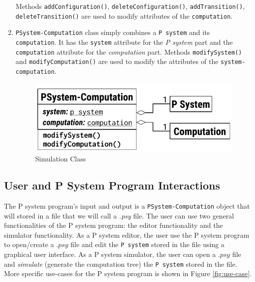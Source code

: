 \documentclass{article}
\begin{document}
\begin{enumerate}
Methods \texttt{addConfiguration()}, \texttt{deleteConfiguration()}, \texttt{addTransition()},
\texttt{deleteTransition()} are used to modify attributes of the \texttt{computation}.


\item \texttt{PSystem-Computation} class simply combines a \texttt{P system} and its
\texttt{computation}. It has the \texttt{system} attribute for the \textit{P system} part and the
\texttt{computation} attribute for the \textit{computation} part. Methods \texttt{modifySystem()}
and \texttt{modifyComputation()} are used to modify the attributes of the
\texttt{system-computation}.

\begin{figure}[H]
\begin{center}
    \includegraphics[scale=0.8]{figures/zzz-simulation.pdf}
    \caption{Simulation Class}
    \label{fig:simulation-class}
\end{center}
\end{figure}


\end{enumerate}


\subsection{User and P System Program Interactions}

The P system program's input and output is a \texttt{PSystem-Computation} object that will stored in
a file that we will call a \textit{.psy} file. The user can use two general functionalities of the P
system program: the editor functionality and the simulator functionality. As a P system editor, the
user use the P system program to open/create a $.psy$ file and edit the \texttt{P system} stored in 
the file using a graphical user interface. As a P system simulator, the user can open a $.psy$ file
and \textit{simulate} (generate the computation tree) the \texttt{P system} stored in the file.
More specific use-cases for the P system program is shown in Figure \ref{fig:use-case}.
\end{document}

